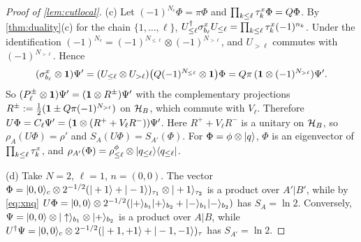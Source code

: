 \begin{proof}[Proof of \cref{lem:cutlocal}]
(c) Let $(-1)^{N_c}\Phi=\pi\Phi$ and $\prod_{k\le\ell}\tau^{x}_{k}\Phi=Q\Phi$.  By \cref{thm:duality}(c) for the
chain $\{1,\dots,\ell\}$, $U_{\le\ell}^\dagger\sigma^{x}_{b_{\ell}}U_{\le\ell}=\prod_{k\le\ell}\tau^{x}_{k}(-1)^{n_k}$.  Under the
identification $(-1)^{N_c}=(-1)^{N_{\le\ell}}\otimes(-1)^{N_{>\ell}}$, and $U_{>\ell}$ commutes with
$(-1)^{N_{>\ell}}$.  Hence
\[
  (\sigma^{x}_{b_{\ell}}\otimes\mathbf{1})\Psi'=(U_{\le\ell}\otimes U_{>\ell})\bigl(Q(-1)^{N_{\le\ell}}\otimes\mathbf{1}\bigr)\Phi
  =Q\pi\,(\mathbf{1}\otimes(-1)^{N_{>\ell}})\Psi' .
\]
So $(P^\pm_\ell\otimes\mathbf{1})\Psi'=(\mathbf{1}\otimes R^\pm)\Psi'$ with the complementary projections
$R^\pm:=\frac12(\mathbf{1}\pm Q\pi(-1)^{N_{>\ell}})$ on $\mathcal{H}_B$, which commute with $V_\ell$.  Therefore
$U\Phi=C_\ell\Psi'=(\mathbf{1}\otimes(R^++V_\ell R^-))\Psi'$.  Here $R^++V_\ell R^-$ is a unitary on $\mathcal{H}_B$,
so $\rho_A(U\Phi)=\rho'$ and $S_A(U\Phi)=S_{A'}(\Phi)$.  For $\Phi=\phi\otimes|q\rangle$, $\Phi$ is an eigenvector of
$\prod_{k\le\ell}\tau^{x}_{k}$, and $\rho_{A'}(\Phi)=\rho^\phi_{\le\ell}\otimes|q_{\le\ell}\rangle\langle q_{\le\ell}|$.

(d) Take $N=2$, $\ell=1$, $n=(0,0)$.  The vector $\Phi=|0,0\rangle_c\otimes2^{-1/2}(|+1\rangle+|-1\rangle)_{\tau_1}\otimes|+1\rangle_{\tau_2}$
is a product over $A'|B'$, while by \eqref{eq:xnq}
$U\Phi=|0,0\rangle\otimes2^{-1/2}(|+\rangle_{b_1}|+\rangle_{b_2}+|-\rangle_{b_1}|-\rangle_{b_2})$ has $S_A=\ln2$.
Conversely, $\Psi=|0,0\rangle\otimes|\uparrow\rangle_{b_1}\otimes|+\rangle_{b_2}$ is a product over $A|B$, while
$U^\dagger\Psi=|0,0\rangle_c\otimes2^{-1/2}(|+1,+1\rangle+|-1,-1\rangle)_{\tau}$ has $S_{A'}=\ln2$.
\end{proof}

